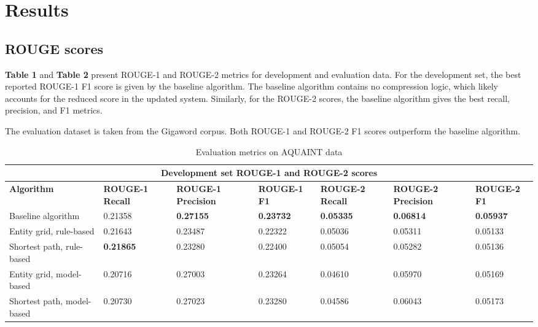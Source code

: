 \documentclass[11pt]{article}
\begin{document}
\section{Results}
\subsection{ROUGE scores}
\textbf{Table 1} and \textbf{Table 2} present ROUGE-1 and ROUGE-2 metrics for development and evaluation data. For the development set, the best reported  ROUGE-1 F1 score is given by the baseline algorithm. The baseline algorithm contains no compression logic, which likely accounts for the reduced score in the updated system. Similarly, for the ROUGE-2 scores, the baseline algorithm gives the best recall, precision, and F1 metrics.

The evaluation dataset is taken from the Gigaword corpus. Both ROUGE-1 and ROUGE-2 F1 scores outperform the baseline algorithm.

\begin{table}[h]
\begin{tabular}{|p{4.3cm}||p{1.735cm}|p{1.78cm}|p{1.735cm}|p{1.735cm}|p{1.78cm}|p{1.735cm}| }
 \hline
 \multicolumn{7}{|c|}{Development set ROUGE-1 and ROUGE-2 scores} \\
 \hline
 \textbf{Algorithm} & \textbf{ROUGE-1 Recall} & \textbf{ROUGE-1 Precision} & \textbf{ROUGE-1 F1} & \textbf{ROUGE-2 Recall} & \textbf{ROUGE-2 Precision} & \textbf{ROUGE-2 F1}\\
 \hline
Baseline algorithm & 0.21358 & \textbf{0.27155} & \textbf{0.23732} & \textbf{0.05335} & \textbf{0.06814} & \textbf{0.05937} \\ 
Entity grid, rule-based & 0.21643 & 0.23487 & 0.22322 & 0.05036 & 0.05311 & 0.05133 \\
Shortest path, rule-based & \textbf{0.21865} & 0.23280 & 0.22400 & 0.05054 & 0.05282 & 0.05136 \\
Entity grid, model-based & 0.20716 & 0.27003 & 0.23264 & 0.04610 & 0.05970 & 0.05169 \\
Shortest path, model-based & 0.20730 & 0.27023 & 0.23280 & 0.04586 & 0.06043 & 0.05173 \\
\hline
\end{tabular}
\caption{Evaluation metrics on AQUAINT data}
\label{tab:dev} 
\end{table}
\end{document}
